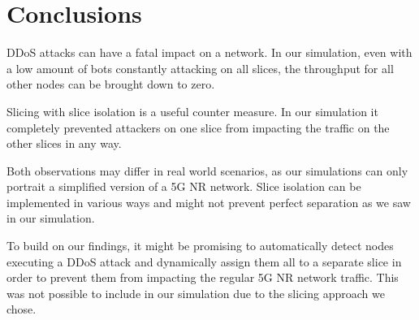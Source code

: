 

\chapter{Conclusions}
\label{chapter:conclusions}

DDoS attacks can have a fatal impact on a network. In our simulation, even with a low amount of bots constantly attacking on all slices, the throughput for all other nodes can be brought down to zero.

Slicing with slice isolation is a useful counter measure. In our simulation it completely prevented attackers on one slice from impacting the traffic on the other slices in any way.

Both observations may differ in real world scenarios, as our simulations can only portrait a simplified version of a 5G NR network. Slice isolation can be implemented in various ways and might not prevent perfect separation as we saw in our simulation.

To build on our findings, it might be promising to automatically detect nodes executing a DDoS attack and dynamically assign them all to a separate slice in order to prevent them from impacting the regular 5G NR network traffic. This was not possible to include in our simulation due to the slicing approach we chose.
